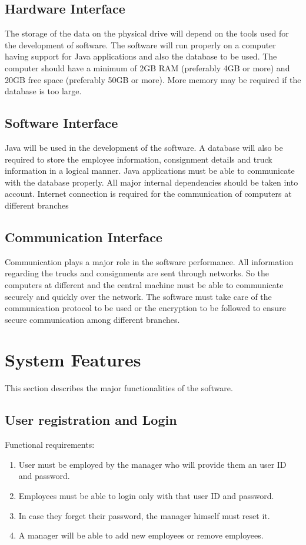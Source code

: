 \documentclass[english,openany,12pt,a4paper,dvipsnames]{book}
\begin{document}
        \subsection{Hardware Interface}
                The storage of the data on the physical drive will depend on the tools used for the development of
                software. The software will run properly on a computer having support for Java applications and
                also the database to be used. The computer should have a minimum of 2GB RAM (preferably 4GB
                or more) and 20GB free space (preferably 50GB or more). More memory may be required if the
                database is too large.
        \subsection{Software Interface}
                Java will be used in the development of the software. A database will also be required to store the
                employee information, consignment details and truck information in a logical manner. Java
                applications must be able to communicate with the database properly. All major internal
                dependencies should be taken into account. Internet connection is required for the communication of
                computers at different branches
        \subsection{Communication Interface}
                Communication plays a major role in the software performance. All information regarding the
                trucks and consignments are sent through networks. So the computers at different and the central
                machine must be able to communicate securely and quickly over the network. The software must
                take care of the communication protocol to be used or the encryption to be followed to ensure secure
                communication among different branches.

\markboth{}{}
\section{System Features}
This section describes the major functionalities of the software.
        \subsection{User registration and Login}
        Functional requirements:
            \begin{enumerate}
              \item User must be employed by the manager who will provide them an user ID and password.
              \item Employees must be able to login only with that user ID and password.
              \item In case they forget their password, the manager himself must reset it.
              \item A manager will be able to add new employees or remove employees.
            \end{enumerate}
\end{document}

